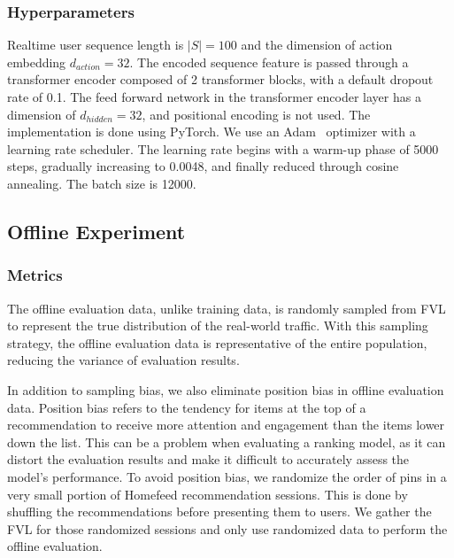 \subsubsection{Hyperparameters}
Realtime user sequence length is $|S| = 100$ and the dimension of action embedding $d_{action} = 32$. 
The encoded sequence feature is passed through a transformer encoder composed of 2 transformer blocks, with a default dropout rate of 0.1. 
The feed forward network in the transformer encoder layer has a dimension of $d_{hidden}=32$, and positional encoding is not used. 
The implementation is done using PyTorch. We use an Adam~\cite{adam} optimizer with a learning rate scheduler. The learning rate begins with a warm-up phase of 5000 steps, gradually increasing to 0.0048, and finally reduced through cosine annealing. The batch size is 12000.

\subsection{Offline Experiment}

\subsubsection{Metrics}

The offline evaluation data, unlike training data, is randomly sampled from FVL to represent the true distribution of the real-world traffic. With this sampling strategy, the offline evaluation data is representative of the entire population, reducing the variance of evaluation results.

In addition to sampling bias, we also eliminate position bias in offline evaluation data.
Position bias refers to the tendency for items at the top of a recommendation to receive more attention and engagement than the items lower down the list. This can be a problem when evaluating a ranking model, as it can distort the evaluation results and make it difficult to accurately assess the model's performance. To avoid position bias, we randomize the order of pins in a very small portion of Homefeed recommendation sessions. This is done by shuffling the recommendations before presenting them to users. We gather the FVL for those randomized sessions and only use randomized data to perform the offline evaluation.


